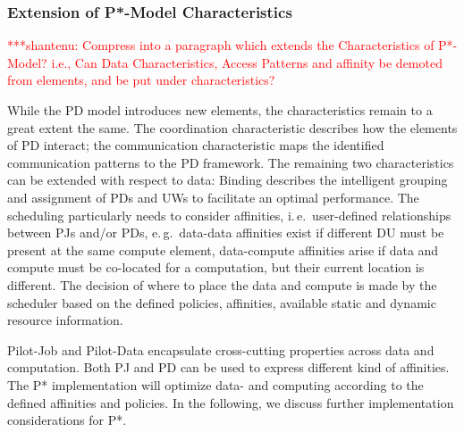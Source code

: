 \documentclass[conference,final]{IEEEtran}
\newcommand{\jhanote}[1]{ {\textcolor{red} { ***shantenu: #1 }}}
\newcommand{\alnote}[1]{ {\textcolor{blue} { ***andre: #1 }}}
\newcommand{\alnote}[1]{}
\newcommand{\jhanote}[1]{}
\begin{document}

\subsubsection*{Extension of P*-Model Characteristics}

\jhanote{Compress into a paragraph which extends the Characteristics
  of P*-Model? i.e., Can Data Characteristics, Access Patterns and
  affinity be demoted from elements, and be put under
  characteristics?}

While the PD model introduces new elements, the characteristics remain to a
great extent the same. The coordination characteristic describes how the
elements of PD interact; the communication characteristic maps the identified
communication patterns to the PD framework. The remaining two characteristics
can be extended with respect to data: Binding describes the intelligent grouping
and assignment of PDs and UWs to facilitate an optimal performance. The
scheduling particularly needs to consider affinities, i.\,e.\ user-defined
relationships between PJs and/or PDs, e.\,g.\ data-data affinities exist if
different DU must be present at the same compute element, data-compute
affinities arise if data and compute must be co-located for a computation, but
their current location is different. The decision of where to place the data and
compute is made by the scheduler based on the defined policies, affinities,
available static and dynamic resource information.


Pilot-Job and Pilot-Data encapsulate cross-cutting properties across
data and computation. Both PJ and PD can be used to express different
kind of affinities.  The P* implementation will optimize data- and
computing according to the defined affinities and policies. In the
following, we discuss further implementation considerations for P*.
\end{document}
